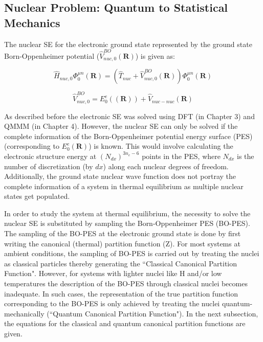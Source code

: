 \subsection{Nuclear Problem: Quantum to Statistical Mechanics}
\label{nuclear_problem}
\noindent The nuclear SE for the electronic ground state represented  by the ground state Born-Oppenheimer potential ($\hat{V}^{BO}_{nuc,0}(\textbf{R})$) is given as: 

\begin{equation}
    \label{NSE-1}
    \hat{H}_{nuc,0}\Phi^{\mu n}_{0}(\textbf{R}) = (\hat{T}_{nuc} + \hat{V}^{BO}_{nuc,0}(\textbf{R})) \Phi^{\mu n}_{0}(\textbf{R})
\end{equation}

\begin{equation}
    \label{NSE-2}
    \hat{V}^{BO}_{nuc,0}=E^{e}_{0}((\textbf{R}))+\hat{V}_{nuc-nuc}(\textbf{R})
\end{equation}

\noindent As described before the electronic SE was solved using DFT (in Chapter 3) and QMMM (in Chapter 4). However, the nuclear SE can only be solved if the complete information of the Born-Oppenheimer potential energy surface (PES) (corresponding to  $E^{e}_{0}(\textbf{R})$) is known. This would involve calculating the electronic structure energy at $(N_{dx})^{3n_e-6}$ points in the PES, where $N_{dx}$ is the number of discretization (by $dx$) along each nuclear degrees of freedom. Additionally, the ground state nuclear wave function does not portray the complete information of a system in thermal equilibrium as multiple nuclear states get populated.  

\noindent In order to study the system at thermal equilibrium, the necessity to solve the nuclear SE is substituted by sampling the Born-Oppenheimer PES (BO-PES). The sampling of the BO-PES at the electronic ground state is done by first writing the canonical (thermal) partition function (Z). For most systems at ambient conditions, the sampling of BO-PES is carried out by treating the nuclei as classical particles thereby generating the ``Classical Canonical Partition Function". However, for systems with lighter nuclei like H and/or low temperatures the description of the BO-PES through classical nuclei becomes inadequate. In such cases, the representation of the true partition function corresponding to the BO-PES is only achieved by treating the nuclei quantum-mechanically (``Quantum Canonical Partition Function"). In the next subsection, the equations for the classical and quantum canonical partition functions are given. 

